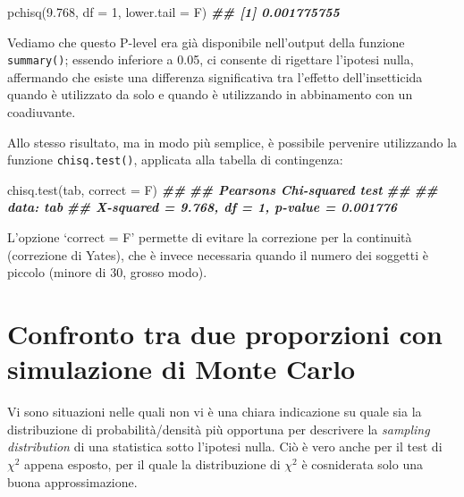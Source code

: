 \documentclass[
  12pt,
]{book}
\newenvironment{Shaded}{\begin{snugshade}}{\end{snugshade}}
\newcommand{\AttributeTok}[1]{\textcolor[rgb]{0.77,0.63,0.00}{#1}}
\newcommand{\DecValTok}[1]{\textcolor[rgb]{0.00,0.00,0.81}{#1}}
\newcommand{\DocumentationTok}[1]{\textcolor[rgb]{0.56,0.35,0.01}{\textbf{\textit{#1}}}}
\newcommand{\FloatTok}[1]{\textcolor[rgb]{0.00,0.00,0.81}{#1}}
\newcommand{\FunctionTok}[1]{\textcolor[rgb]{0.00,0.00,0.00}{#1}}
\newcommand{\NormalTok}[1]{#1}
\begin{document}
\begin{Shaded}
\begin{Highlighting}[]
\FunctionTok{pchisq}\NormalTok{(}\FloatTok{9.768}\NormalTok{, }\AttributeTok{df =} \DecValTok{1}\NormalTok{, }\AttributeTok{lower.tail =}\NormalTok{ F)}
\DocumentationTok{\#\# [1] 0.001775755}
\end{Highlighting}
\end{Shaded}

Vediamo che questo P-level era già disponibile nell'output della funzione \texttt{summary()}; essendo inferiore a 0.05, ci consente di rigettare l'ipotesi nulla, affermando che esiste una differenza significativa tra l'effetto dell'insetticida quando è utilizzato da solo e quando è utilizzando in abbinamento con un coadiuvante.

Allo stesso risultato, ma in modo più semplice, è possibile pervenire utilizzando la funzione \texttt{chisq.test()}, applicata alla tabella di contingenza:

\begin{Shaded}
\begin{Highlighting}[]
\FunctionTok{chisq.test}\NormalTok{(tab, }\AttributeTok{correct =}\NormalTok{ F)}
\DocumentationTok{\#\# }
\DocumentationTok{\#\#  Pearson\textquotesingle{}s Chi{-}squared test}
\DocumentationTok{\#\# }
\DocumentationTok{\#\# data:  tab}
\DocumentationTok{\#\# X{-}squared = 9.768, df = 1, p{-}value = 0.001776}
\end{Highlighting}
\end{Shaded}

L'opzione `correct = F' permette di evitare la correzione per la continuità (correzione di Yates), che è invece necessaria quando il numero dei soggetti è piccolo (minore di 30, grosso modo).

\hypertarget{confronto-tra-due-proporzioni-con-simulazione-di-monte-carlo}{%
\section{Confronto tra due proporzioni con simulazione di Monte Carlo}\label{confronto-tra-due-proporzioni-con-simulazione-di-monte-carlo}}

Vi sono situazioni nelle quali non vi è una chiara indicazione su quale sia la distribuzione di probabilità/densità più opportuna per descrivere la \emph{sampling distribution} di una statistica sotto l'ipotesi nulla. Ciò è vero anche per il test di \(\chi^2\) appena esposto, per il quale la distribuzione di \(\chi^2\) è cosniderata solo una buona approssimazione.
\end{document}
